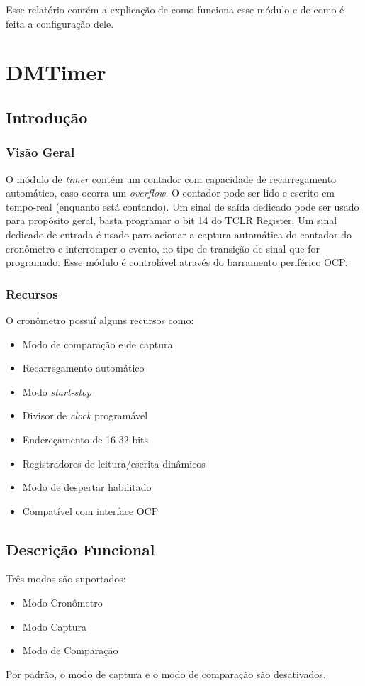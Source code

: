 \documentclass[12pt]{article}
\begin{document}
	Esse relatório contém a explicação de como funciona esse módulo e de como é feita a configuração dele.  
\section{DMTimer}
	\subsection{Introdução}
		\subsubsection{Visão Geral}
			O módulo de \textit{timer} contém um contador com capacidade de recarregamento automático, caso ocorra um \textit{overflow}. O contador pode ser lido e escrito em tempo-real (enquanto está contando). Um sinal de saída dedicado pode ser usado para propósito geral, basta programar o bit 14 do TCLR Register. Um sinal dedicado de entrada é usado para acionar a captura automática do contador do cronômetro e interromper o evento, no tipo de transição de sinal que for programado. Esse módulo é controlável através do barramento periférico OCP.
		\subsubsection{Recursos}
			O cronômetro possuí alguns recursos como:
			\begin{itemize}
				\item Modo de comparação e de captura
				\item Recarregamento automático
				\item Modo \textit{start-stop}
				\item Divisor de \textit{clock} programável
				\item Endereçamento de 16-32-bits
				\item Registradores de leitura/escrita dinâmicos
				\item Modo de despertar habilitado
				\item Compatível com interface OCP
			\end{itemize}
	\subsection{Descrição Funcional}
		Três modos são suportados:
		\begin{itemize}
			\item Modo Cronômetro
			\item Modo Captura
			\item Modo de Comparação
		\end{itemize}
		Por padrão, o modo de captura e o modo de comparação são desativados.
\end{document}
